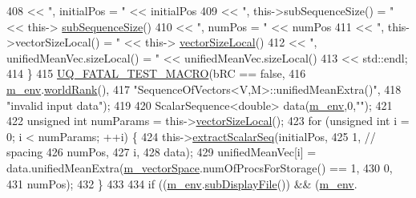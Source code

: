 \begin{DoxyCode}
408                             << \textcolor{stringliteral}{", initialPos = "}                 << initialPos
409                             << \textcolor{stringliteral}{", this->subSequenceSize() = "}    << this->
      \hyperlink{class_q_u_e_s_o_1_1_sequence_of_vectors_a0224bd3e961d86af5d2886301c0c2b86}{subSequenceSize}()
410                             << \textcolor{stringliteral}{", numPos = "}                     << numPos
411                             << \textcolor{stringliteral}{", this->vectorSizeLocal() = "}    << this->
      \hyperlink{class_q_u_e_s_o_1_1_base_vector_sequence_a2fefedf9e5b90f22881103b3f92555f6}{vectorSizeLocal}()
412                             << \textcolor{stringliteral}{", unifiedMeanVec.sizeLocal() = "} << unifiedMeanVec.sizeLocal()
413                             << std::endl;
414   \}
415   \hyperlink{_defines_8h_a56d63d18d0a6d45757de47fcc06f574d}{UQ\_FATAL\_TEST\_MACRO}(bRC == \textcolor{keyword}{false},
416                       \hyperlink{class_q_u_e_s_o_1_1_base_vector_sequence_a8e8824d2a63c5a43bcc6473e3a0491e8}{m\_env}.\hyperlink{class_q_u_e_s_o_1_1_base_environment_a78b57112bbd0e6dd0e8afec00b40ffa7}{worldRank}(),
417                       \textcolor{stringliteral}{"SequenceOfVectors<V,M>::unifiedMeanExtra()"},
418                       \textcolor{stringliteral}{"invalid input data"});
419 
420   ScalarSequence<double> data(\hyperlink{class_q_u_e_s_o_1_1_base_vector_sequence_a8e8824d2a63c5a43bcc6473e3a0491e8}{m\_env},0,\textcolor{stringliteral}{""});
421 
422   \textcolor{keywordtype}{unsigned} \textcolor{keywordtype}{int} numParams = this->\hyperlink{class_q_u_e_s_o_1_1_base_vector_sequence_a2fefedf9e5b90f22881103b3f92555f6}{vectorSizeLocal}();
423   \textcolor{keywordflow}{for} (\textcolor{keywordtype}{unsigned} \textcolor{keywordtype}{int} i = 0; i < numParams; ++i) \{
424     this->\hyperlink{class_q_u_e_s_o_1_1_sequence_of_vectors_ac977b3b26a6af2ae727671f1246262fd}{extractScalarSeq}(initialPos,
425                            1, \textcolor{comment}{// spacing}
426                            numPos,
427                            i,
428                            data);
429     unifiedMeanVec[i] = data.unifiedMeanExtra(\hyperlink{class_q_u_e_s_o_1_1_base_vector_sequence_a4bd171e39ed050ff105c808336f35198}{m\_vectorSpace}.numOfProcsForStorage() == 1,
430                                               0,
431                                               numPos);
432   \}
433 
434   \textcolor{keywordflow}{if} ((\hyperlink{class_q_u_e_s_o_1_1_base_vector_sequence_a8e8824d2a63c5a43bcc6473e3a0491e8}{m\_env}.\hyperlink{class_q_u_e_s_o_1_1_base_environment_a8a0064746ae8dddfece4229b9ad374d6}{subDisplayFile}()) && (\hyperlink{class_q_u_e_s_o_1_1_base_vector_sequence_a8e8824d2a63c5a43bcc6473e3a0491e8}{m\_env}.

\end{DoxyCode}
